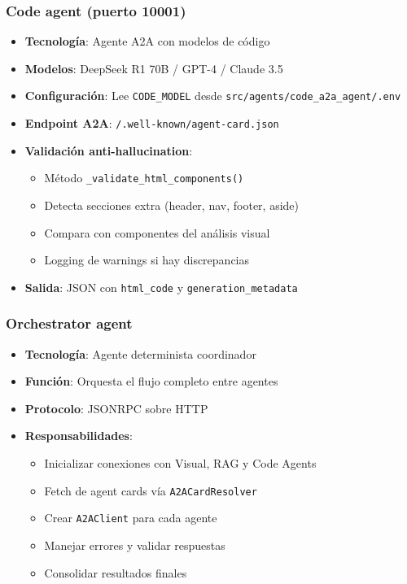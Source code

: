 \documentclass[12pt,a4paper]{article}
\begin{document}
\subsubsection{Code agent (puerto 10001)}
\begin{itemize}
    \item \textbf{Tecnología}: Agente A2A con modelos de código
    \item \textbf{Modelos}: DeepSeek R1 70B / GPT-4 / Claude 3.5
    \item \textbf{Configuración}: Lee \texttt{CODE\_MODEL} desde \texttt{src/agents/code\_a2a\_agent/.env}
    \item \textbf{Endpoint A2A}: \texttt{/.well-known/agent-card.json}
    \item \textbf{Validación anti-hallucination}:
    \begin{itemize}
        \item Método \texttt{\_validate\_html\_components()}
        \item Detecta secciones extra (header, nav, footer, aside)
        \item Compara con componentes del análisis visual
        \item Logging de warnings si hay discrepancias
    \end{itemize}
    \item \textbf{Salida}: JSON con \texttt{html\_code} y \texttt{generation\_metadata}
\end{itemize}

\subsubsection{Orchestrator agent}
\begin{itemize}
    \item \textbf{Tecnología}: Agente determinista coordinador
    \item \textbf{Función}: Orquesta el flujo completo entre agentes
    \item \textbf{Protocolo}: JSONRPC sobre HTTP
    \item \textbf{Responsabilidades}:
    \begin{itemize}
        \item Inicializar conexiones con Visual, RAG y Code Agents
        \item Fetch de agent cards vía \texttt{A2ACardResolver}
        \item Crear \texttt{A2AClient} para cada agente
        \item Manejar errores y validar respuestas
        \item Consolidar resultados finales
    \end{itemize}
\end{itemize}
\end{document}
